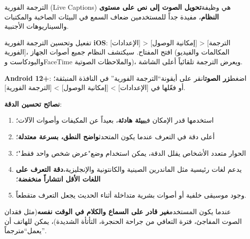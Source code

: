 
الترجمة الفورية (Live Captions) هي وظيفة\textbf{تحويل الصوت إلى نص على مستوى النظام}، مفيدة جداً للمستخدمين ضعاف السمع في البيئات الصاخبة والمكتبات والسيناريوهات الأجنبية.

\begin{tcbinfo}{تفعيل وتحسين الترجمة الفورية}
\textbf{iOS}: [الإعدادات] > [إمكانية الوصول] > [الترجمة الفورية]، افتح المفتاح. سيكتشف النظام جميع أصوات الجهاز (المكالمات والفيديو والبودكاست وFaceTime والملاحظات الصوتية)، ويعرض الترجمة تلقائياً أعلى الشاشة.

\textbf{Android 12+}: اضغط\textbf{زر الصوت}انقر على أيقونة“الترجمة الفورية” في النافذة المنبثقة؛ أو فعّلها في [الإعدادات] > [إمكانية الوصول] > [الترجمة الفورية].

\textbf{نصائح تحسين الدقة}:

\begin{enumerate}
  \item استخدمها قدر الإمكان في\textbf{بيئة هادئة}، بعيداً عن المكيفات وأصوات الآلات؛
  \item أعلى دقة في التعرف عندما يكون المتحدث\textbf{واضح النطق، بسرعة معتدلة}؛
  \item الحوار متعدد الأشخاص يقلل الدقة، يمكن استخدام وضع"عرض شخص واحد فقط"؛
  \item يدعم لغات رئيسية مثل الماندرين الصينية والكانتونية والإنجليزية،\textbf{دقة التعرف على اللغات الأقل انتشاراً منخفضة}؛
  \item وجود موسيقى خلفية أو أصوات بشرية متداخلة أثناء الحديث يجعل التعرف متقطعاً.
\end{enumerate}

\end{tcbinfo}


عندما يكون المستخدم\textbf{غير قادر على السماع والكلام في الوقت نفسه}(مثل فقدان الصوت المفاجئ، فترة التعافي من جراحة الحنجرة، التأتأة الشديدة)، يمكن للهاتف أن يعمل“مترجماً”.

